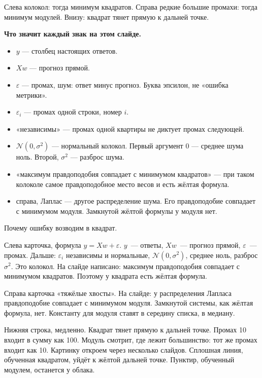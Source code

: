 \documentclass[11pt,a4paper]{article}
\newcommand{\slidehead}[2]{\par\vspace{4mm}{\color{navy}\large\bfseries Слайд #1. #2}\par\vspace{1mm}}
\newcommand{\screen}[1]{\par{\color{ink}\small #1\par}\vspace{1mm}}
\newcommand{\say}[1]{\begin{saybox}#1\end{saybox}}
\newenvironment{signs}{\begin{signbox}{\bfseries Что значит каждый знак на этом слайде.}\par\begin{itemize}[leftmargin=1.15em,itemsep=2pt,topsep=3pt,parsep=0pt]}{\end{itemize}\end{signbox}}
\begin{document}
\slidehead{14}{Квадрат и модуль}
\screen{Слева колокол: тогда минимум квадратов. Справа редкие большие промахи: тогда минимум модулей. Внизу: квадрат тянет прямую к дальней точке.}
\begin{signs}
\item \(y\) — столбец настоящих ответов.
\item \(Xw\) — прогноз прямой.
\item \(\varepsilon\) — промах, шум: ответ минус прогноз. Буква эпсилон, не «ошибка метрики».
\item \(\varepsilon_i\) — промах одной строки, номер \(i\).
\item «независимы» — промах одной квартиры не диктует промах следующей.
\item \(\mathcal{N}(0,\sigma^{2})\) — нормальный колокол. Первый аргумент \(0\) — среднее шума ноль. Второй, \(\sigma^{2}\) — разброс шума.
\item «максимум правдоподобия совпадает с минимумом квадратов» — при таком колоколе самое правдоподобное место весов и есть жёлтая формула.
\item справа, Лаплас — другое распределение шума. Его правдоподобие совпадает с минимумом модуля. Замкнутой жёлтой формулы у модуля нет.
\end{signs}
\say{Почему ошибку возводим в квадрат.

Слева карточка, формула \(y=Xw+\varepsilon\). \(y\)~--- ответы, \(Xw\)~--- прогноз прямой, \(\varepsilon\)~--- промах. Дальше: \(\varepsilon_i\) независимы и нормальные, \(\mathcal N(0,\sigma^{2})\), среднее ноль, разброс \(\sigma^{2}\). Это колокол. На слайде написано: максимум правдоподобия совпадает с минимумом квадратов. Поэтому у квадрата есть жёлтая формула.

Справа карточка «тяжёлые хвосты». На слайде: у распределения Лапласа правдоподобие совпадает с минимумом модуля. Замкнутой системы, как жёлтая формула, нет. Константу для модуля ставят в середину списка, в медиану.

Нижняя строка, медленно. Квадрат тянет прямую к дальней точке. Промах 10 входит в сумму как 100. Модуль смотрит, где лежит большинство: тот же промах входит как 10. Картинку откроем через несколько слайдов. Сплошная линия, обученная квадратом, уйдёт к жёлтой дальней точке. Пунктир, обученный модулем, останется у облака.}
\end{document}
